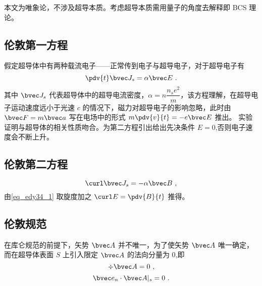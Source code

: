 

本文为唯象论，不涉及超导本质。考虑超导本质需用量子的角度去解释即 BCS 理论。
\subsection{伦敦第一方程}
假定超导体中有两种载流电子——正常传到电子与超导电子，对于超导电子有
\begin{equation}
\pdv{t}\bvec J_s=\alpha\bvec E \label{eq_edy34_1}~.
\end{equation}
其中 $\bvec J_s$ 代表超导体中的超导电流密度，$\alpha=n\dfrac {n_se^2}m$，该方程理解，在超导电子运动速度远小于光速 $c$ 的情况下，磁力对超导电子的影响忽略，此时由 $\bvec F=m \bvec a$ 写在电场中的形式 $m\pdv{v}{t}=-e\bvec E$ 推出。
实验证明与超导体的相关性质吻合。为第二方程引出给出先决条件 $E=0$,否则电子速度会不断上升。
\subsection{伦敦第二方程}
\begin{equation}
\curl\bvec J_s=-\alpha\bvec B \label{eq_edy34_2}~,
\end{equation}
由\autoref{eq_edy34_1} 取旋度加之 $\curl E=\pdv{B}{t}$ 推得。
\subsection{伦敦规范}
在库仑规范的前提下，矢势 $\bvec A$ 并不唯一，为了使矢势 $\bvec A$ 唯一确定，而在超导体表面 $S$ 上引入限定 $\bvec A$ 的法向分量为 $0$,即
\begin{equation}
\div \bvec A=0~,
\end{equation}
\begin{equation}
\bvec e_n \cdot \bvec A|_s=0~.
\end{equation}

